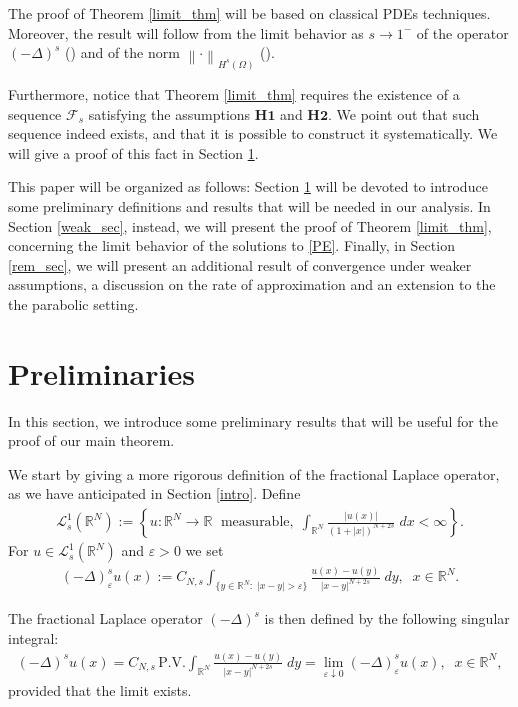 \documentclass[reqno,twoside]{amsart}
\numberwithin{equation}{section}
\def\RR{{\mathbb{R}}}
\newcommand{\norm}[2]{{\left\|#1\right\|}_{#2}}
\newcommand{\fl}[2]{(-\Delta)^#1#2}
\newcommand{\cns}{C_{N,s}}
\begin{document}
The proof of Theorem \ref{limit_thm} will be based on classical PDEs techniques. Moreover, the result will follow from the limit behavior as $s\to 1^-$ of the operator $\fl{s}{}$ (\cite{dihitchhiker,stinga2010extension}) and of the norm $\norm{\cdot}{H^s(\Omega)}$ (\cite{bourgain2001another}).

Furthermore, notice that Theorem \ref{limit_thm} requires the existence of a sequence $\mathcal{F}_s$ satisfying the assumptions $\textbf{H1}$ and $\textbf{H2}$. We point out that such sequence indeed exists, and that it is possible to construct it systematically. We will give a proof of this fact in Section \ref{prel}.

This paper will be organized as follows: Section \ref{prel} will be devoted to introduce some preliminary definitions and results that will be needed in our analysis. In Section \ref{weak_sec}, instead, we will present the proof of Theorem \ref{limit_thm}, concerning the limit behavior of the solutions to \eqref{PE}. Finally, in Section \ref{rem_sec}, we will present an additional result of convergence under weaker assumptions, a discussion on the rate of approximation and an extension to the the parabolic setting.

\section{Preliminaries}\label{prel}

In this section, we introduce some preliminary results that will be useful for the proof of our main theorem.

We start by giving a more rigorous definition of the fractional Laplace operator, as we have anticipated in Section \ref{intro}. Define 
\begin{align*}
	\mathcal L_s^{1}(\RR^N):=\left\{u:\RR^N\to\RR\;\mbox{ measurable},\; \int_{\RR^N}\frac{|u(x)|}{(1+|x|)^{N+2s}}\;dx<\infty\right\}.
\end{align*}
For $u\in \mathcal L_s^{1}(\RR^N)$ and $\varepsilon>0$ we set
\begin{align*}
	(-\Delta)_\varepsilon^s u(x):= C_{N,s}\int_{\{y\in\RR^N:\;|x-y|>\varepsilon\}}\frac{u(x)-u(y)}{|x-y|^{N+2s}}\;dy,\;\;x\in\RR^N.
\end{align*}

The fractional Laplace operator $\fl{s}{}$ is then defined by the following singular integral:
\begin{align}\label{fl_def}
	\fl{s}{u}(x)=\cns\,\mbox{P.V.}\int_{\RR^N}\frac{u(x)-u(y)}{|x-y|^{N+2s}}\;dy=\lim_{\varepsilon\downarrow 0}(-\Delta)_\varepsilon^s u(x),\;\;x\in\RR^N,
\end{align}
provided that the limit exists. 
\end{document}
